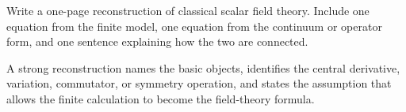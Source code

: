 \begin{exercise}
Write a one-page reconstruction of classical scalar field theory.  Include one equation from the finite model, one equation from the continuum or operator form, and one sentence explaining how the two are connected.
\begin{answer}
A strong reconstruction names the basic objects, identifies the central derivative, variation, commutator, or symmetry operation, and states the assumption that allows the finite calculation to become the field-theory formula.
\end{answer}
\end{exercise}
